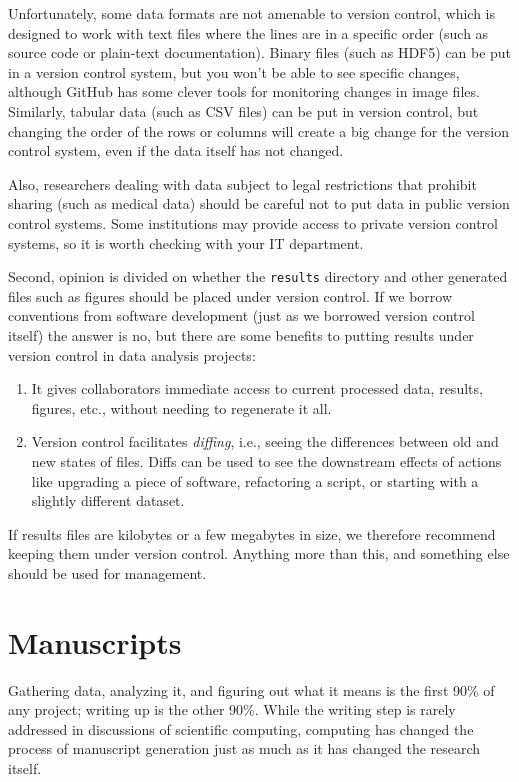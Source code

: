 \documentclass[10pt]{article}
\begin{document}
Unfortunately, some data formats are not amenable to version control,
which is designed to work with text files where the lines are in a
specific order (such as source code or plain-text documentation). Binary
files (such as HDF5) can be put in a version control system, but you
won't be able to see specific changes, although GitHub has some clever
tools for monitoring changes in image files. Similarly, tabular data
(such as CSV files) can be put in version control, but changing the
order of the rows or columns will create a big change for the version
control system, even if the data itself has not changed.

Also, researchers dealing with data subject to legal restrictions that
prohibit sharing (such as medical data) should be careful not to put
data in public version control systems. Some institutions may provide
access to private version control systems, so it is worth checking with
your IT department.

Second, opinion is divided on whether the \texttt{results} directory and
other generated files such as figures should be placed under version
control. If we borrow conventions from software development (just as we
borrowed version control itself) the answer is no, but there are some
benefits to putting results under version control in data analysis
projects:

\begin{enumerate}
\item
  It gives collaborators immediate access to current processed data,
  results, figures, etc., without needing to regenerate it all.
\item
  Version control facilitates \emph{diffing}, i.e., seeing the
  differences between old and new states of files. Diffs can be used to
  see the downstream effects of actions like upgrading a piece of
  software, refactoring a script, or starting with a slightly different
  dataset.
\end{enumerate}

If results files are kilobytes or a few megabytes in size, we therefore
recommend keeping them under version control. Anything more than this,
and something else should be used for management.

\section{Manuscripts}\label{sec:manuscripts}

Gathering data, analyzing it, and figuring out what it means is the
first 90\% of any project; writing up is the other 90\%. While the
writing step is rarely addressed in discussions of scientific computing,
computing has changed the process of manuscript generation just as much
as it has changed the research itself.
\end{document}
